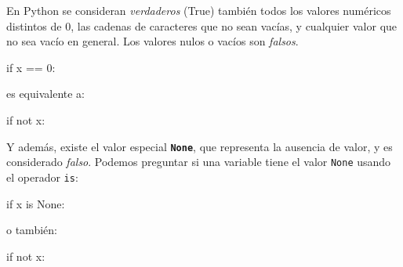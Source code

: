 \documentclass[
  letterpaper,
  DIV=11,
  numbers=noendperiod]{scrreprt}
\newenvironment{Shaded}{\begin{snugshade}}{\end{snugshade}}
\newcommand{\ControlFlowTok}[1]{\textcolor[rgb]{0.00,0.23,0.31}{#1}}
\newcommand{\DecValTok}[1]{\textcolor[rgb]{0.68,0.00,0.00}{#1}}
\newcommand{\KeywordTok}[1]{\textcolor[rgb]{0.00,0.23,0.31}{#1}}
\newcommand{\NormalTok}[1]{\textcolor[rgb]{0.00,0.23,0.31}{#1}}
\newcommand{\OperatorTok}[1]{\textcolor[rgb]{0.37,0.37,0.37}{#1}}
\newcommand{\VariableTok}[1]{\textcolor[rgb]{0.07,0.07,0.07}{#1}}
\begin{document}
\begin{tcolorbox}[enhanced jigsaw, bottomrule=.15mm, leftrule=.75mm, opacityback=0, colback=white, toprule=.15mm, bottomtitle=1mm, opacitybacktitle=0.6, rightrule=.15mm, left=2mm, arc=.35mm, coltitle=black, title=\textcolor{quarto-callout-tip-color}{\faLightbulb}\hspace{0.5em}{Sabías que\ldots{} ?}, breakable, toptitle=1mm, colframe=quarto-callout-tip-color-frame, titlerule=0mm, colbacktitle=quarto-callout-tip-color!10!white]

En Python se consideran \emph{verdaderos} (True) también todos los
valores numéricos distintos de 0, las cadenas de caracteres que no sean
vacías, y cualquier valor que no sea vacío en general. Los valores nulos
o vacíos son \emph{falsos}.

\begin{Shaded}
\begin{Highlighting}[]
\ControlFlowTok{if}\NormalTok{ x }\OperatorTok{==} \DecValTok{0}\NormalTok{:}
\end{Highlighting}
\end{Shaded}

es equivalente a:

\begin{Shaded}
\begin{Highlighting}[]
\ControlFlowTok{if} \KeywordTok{not}\NormalTok{ x:}
\end{Highlighting}
\end{Shaded}

Y además, existe el valor especial \textbf{\texttt{None}}, que
representa la ausencia de valor, y es considerado \emph{falso}. Podemos
preguntar si una variable tiene el valor \texttt{None} usando el
operador \texttt{is}:

\begin{Shaded}
\begin{Highlighting}[]
\ControlFlowTok{if}\NormalTok{ x }\KeywordTok{is} \VariableTok{None}\NormalTok{:}
\end{Highlighting}
\end{Shaded}

o también:

\begin{Shaded}
\begin{Highlighting}[]
\ControlFlowTok{if} \KeywordTok{not}\NormalTok{ x:}
\end{Highlighting}
\end{Shaded}

\end{tcolorbox}
\end{document}
